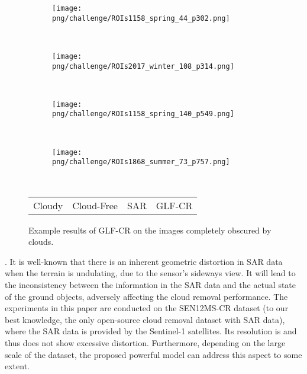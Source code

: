 \documentclass[a4paper,fleqn]{cas-dc}
\begin{document}
\begin{figure}[!t]
    \centering
    \begin{subfigure}[b]{0.48\textwidth}
     \centering
     \texttt{[image: png/challenge/ROIs1158\_spring\_44\_p302.png]}
    \end{subfigure}
    \\
    \begin{subfigure}[b]{0.48\textwidth}
     \centering
     \texttt{[image: png/challenge/ROIs2017\_winter\_108\_p314.png]}
    \end{subfigure}
    \\
    \begin{subfigure}[b]{0.48\textwidth}
     \centering
     \texttt{[image: png/challenge/ROIs1158\_spring\_140\_p549.png]}
    \end{subfigure}
    \\
    \begin{subfigure}[b]{0.48\textwidth}
     \centering
     \texttt{[image: png/challenge/ROIs1868\_summer\_73\_p757.png]}
    \end{subfigure}
    \\
    \begin{minipage}{0.48\textwidth}
    \begin{tabu} to \textwidth {X[c] X[c] X[c] X[c]}
    Cloudy & Cloud-Free & SAR & GLF-CR
    \end{tabu}
    \end{minipage}
    \caption{Example results of GLF-CR on the images completely obscured by clouds.}
    \label{fig:challenge}
    \vspace{-5mm}
\end{figure} 
.
It is well-known that there is an inherent geometric distortion in SAR data when the terrain is undulating, due to the sensor's sideways view. It will lead to the inconsistency between the information in the SAR data and the actual state of the ground objects, adversely affecting the cloud removal performance. The experiments in this paper are conducted on the SEN12MS-CR dataset (to our best knowledge, the only open-source cloud removal dataset with SAR data), where the SAR data is provided by the Sentinel-1 satellites. Its resolution is  and thus does not show excessive distortion. Furthermore, depending on the large scale of the dataset, the proposed powerful model can address this aspect to some extent. 
\end{document}
